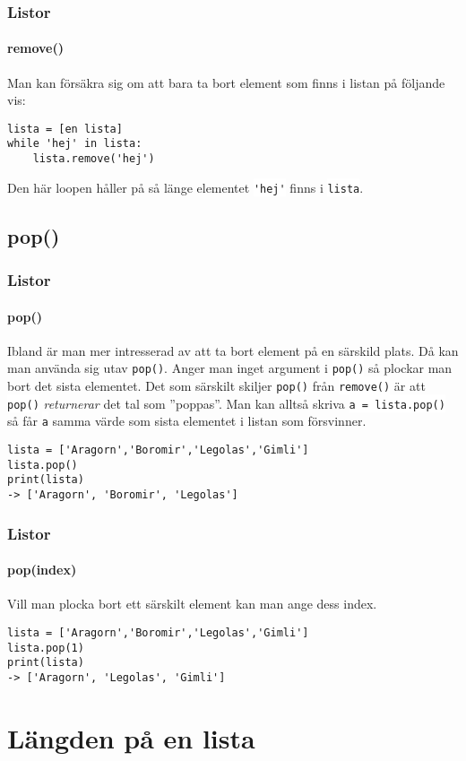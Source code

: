 \documentclass{beamer}
\newcommand{\code}[1]{\colorbox{white}{\lstinline{#1}}}
\begin{document}
\begin{frame}[fragile]
\frametitle{Listor}
\framesubtitle{remove()}

Man kan försäkra sig om att bara ta bort element som finns i listan på följande vis:

\begin{lstlisting}
lista = [en lista]
while 'hej' in lista:
    lista.remove('hej')
\end{lstlisting}

Den här loopen håller på så länge elementet \code{'hej'} finns i \code{lista}.

\end{frame}

\subsection{pop()}

\begin{frame}[fragile]
\frametitle{Listor}
\framesubtitle{pop()}

Ibland är man mer intresserad av att ta bort element på en särskild plats. Då kan man använda sig utav \code{pop()}. Anger man inget argument i \code{pop()} så plockar man bort det sista elementet. Det som särskilt skiljer \code{pop()} från \code{remove()} är att \code{pop()} \textit{returnerar} det tal som ''poppas''. Man kan alltså skriva \code{a = lista.pop()} så får \code{a} samma värde som sista elementet i listan som försvinner.

\begin{lstlisting}
lista = ['Aragorn','Boromir','Legolas','Gimli']
lista.pop()
print(lista)
-> ['Aragorn', 'Boromir', 'Legolas']
\end{lstlisting}

\end{frame}

\begin{frame}[fragile]
\frametitle{Listor}
\framesubtitle{pop(index)}

Vill man plocka bort ett särskilt element kan man ange dess index.

\begin{lstlisting}
lista = ['Aragorn','Boromir','Legolas','Gimli']
lista.pop(1)
print(lista)
-> ['Aragorn', 'Legolas', 'Gimli']
\end{lstlisting}
\end{frame}

\section{Längden på en lista}
\end{document}
